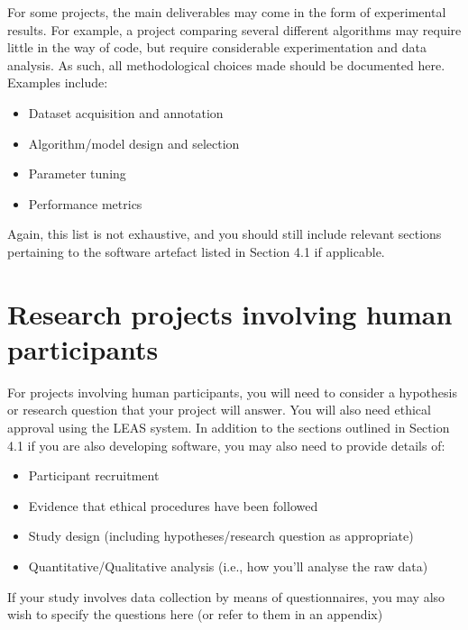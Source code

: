 For some projects, the main deliverables may come in the form of experimental results. For example, a project comparing several different algorithms may require little in the way of code, but require considerable experimentation and data analysis. As such, all methodological choices made should be documented here. Examples include:
\begin{itemize}
    \item Dataset acquisition and annotation
    \item Algorithm/model design and selection
    \item Parameter tuning
    \item Performance metrics
\end{itemize}
Again, this list is not exhaustive, and you should still include relevant sections pertaining to the software artefact listed in Section 4.1 if applicable.



\section{Research projects involving human participants}

For projects involving human participants, you will need to consider a hypothesis or research question that your project will answer. You will also need ethical approval using the LEAS system. In addition to the sections outlined in Section 4.1 if you are also developing software, you may also need to provide details of:
\begin{itemize}
    \item Participant recruitment
    \item Evidence that ethical procedures have been followed
    \item Study design (including hypotheses/research question as appropriate)
    \item Quantitative/Qualitative analysis (i.e., how you'll analyse the raw data)
\end{itemize}
If your study involves data collection by means of questionnaires, you may also wish to specify the questions here (or refer to them in an appendix)

